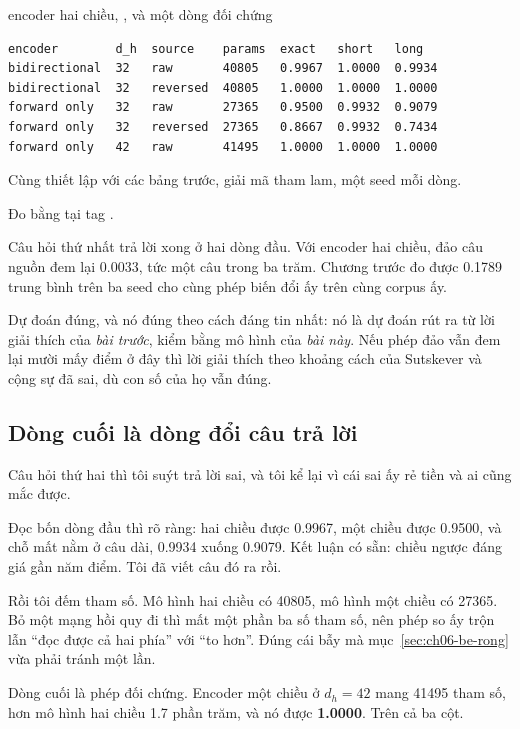 \begin{measured}{encoder hai chiều, , và một dòng đối chứng}
\begin{verbatim}
encoder        d_h  source    params  exact   short   long
bidirectional  32   raw       40805   0.9967  1.0000  0.9934
bidirectional  32   reversed  40805   1.0000  1.0000  1.0000
forward only   32   raw       27365   0.9500  0.9932  0.9079
forward only   32   reversed  27365   0.8667  0.9932  0.7434
forward only   42   raw       41495   1.0000  1.0000  1.0000
\end{verbatim}

Cùng thiết lập với các bảng trước, giải mã tham lam, một seed mỗi dòng.

Đo bằng  tại tag .
\end{measured}

%
Câu hỏi thứ nhất trả lời xong ở hai dòng đầu. Với encoder hai chiều, đảo câu
nguồn đem lại 0.0033, tức một câu trong ba trăm. Chương trước đo được 0.1789
trung bình trên ba seed cho cùng phép biến đổi ấy trên cùng corpus ấy.

Dự đoán đúng, và nó đúng theo cách đáng tin nhất: nó là dự đoán rút ra từ lời
giải thích của \emph{bài trước}, kiểm bằng mô hình của \emph{bài này}. Nếu phép
đảo vẫn đem lại mười mấy điểm ở đây thì lời giải thích theo khoảng cách của
Sutskever và cộng sự đã sai, dù con số của họ vẫn đúng.

\subsection*{Dòng cuối là dòng đổi câu trả lời}

%
Câu hỏi thứ hai thì tôi suýt trả lời sai, và tôi kể lại vì cái sai ấy rẻ tiền
và ai cũng mắc được.

Đọc bốn dòng đầu thì rõ ràng: hai chiều được 0.9967, một chiều được 0.9500, và
chỗ mất nằm ở câu dài, 0.9934 xuống 0.9079. Kết luận có sẵn: chiều ngược đáng
giá gần năm điểm. Tôi đã viết câu đó ra rồi.

Rồi tôi đếm tham số. Mô hình hai chiều có 40805, mô hình một chiều có 27365.
Bỏ một mạng hồi quy đi thì mất một phần ba số tham số, nên phép so ấy trộn lẫn
\enquote{đọc được cả hai phía} với \enquote{to hơn}. Đúng cái bẫy mà
mục~\ref{sec:ch06-be-rong} vừa phải tránh một lần.

Dòng cuối là phép đối chứng. Encoder một chiều ở \(d_h = 42\) mang 41495 tham
số, hơn mô hình hai chiều 1.7 phần trăm, và nó được \textbf{1.0000}. Trên cả ba
cột.


